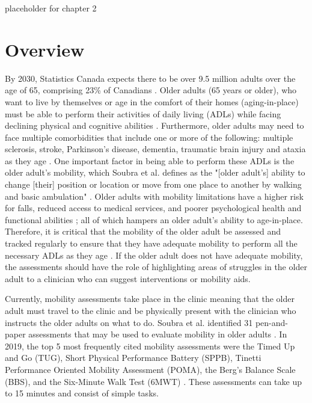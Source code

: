 placeholder for chapter 2

%


\section{Overview}
By 2030, Statistics Canada expects there to be over 9.5 million adults over the age of 65, 
comprising 23\% of Canadians \cite{government_of_canada_daily_2014}. Older adults (65 years or older), who want to live by themselves 
or age in the comfort of their homes (aging-in-place) must be able to perform their activities of 
daily living (ADLs) while facing declining physical and cognitive abilities \cite{tijsen_challenging_2019}. Furthermore, older 
adults may need to face multiple comorbidities that include one or more of the following: 
multiple sclerosis, stroke, Parkinson's disease, dementia, traumatic brain injury 
and ataxia as they age \cite{block_remote_2016}. One important factor in being able to perform 
these ADLs is the older adult's mobility, which Soubra et al. defines as the "[older adult's] 
ability to change [their] position or location or move from one place to another by walking 
and basic ambulation" \cite{soubra_systematic_2019}. Older adults with mobility limitations have a higher risk for falls, 
reduced access to medical services, and poorer psychological health and functional abilities \cite{musich_impact_2018}; 
all of which hampers an older adult’s ability to age-in-place. Therefore, it is critical that the 
mobility of the older adult be assessed and tracked regularly to ensure that they have adequate 
mobility to perform all the necessary ADLs as they age \cite{musich_impact_2018}. If the older adult does not have 
adequate mobility, the assessments should have the role of highlighting areas of struggles in 
the older adult \cite{soubra_systematic_2019,zampieri_assessing_2011} to a clinician who can suggest interventions or mobility aids.

Currently, mobility assessments take place in the clinic meaning that the older adult must travel 
to the clinic and be physically present with the clinician who instructs the older adults on what 
to do. Soubra et al. identified 31 pen-and-paper assessments that may be used to evaluate mobility 
in older adults \cite{soubra_systematic_2019}. In 2019, the top 5 most frequently cited mobility assessments were the Timed 
Up and Go (TUG), Short Physical Performance Battery (SPPB), Tinetti Performance Oriented Mobility 
Assessment (POMA), the Berg's Balance Scale (BBS), and the Six-Minute Walk Test (6MWT) \cite{soubra_systematic_2019}. 
These assessments can take up to 15 minutes and consist of simple tasks. 

